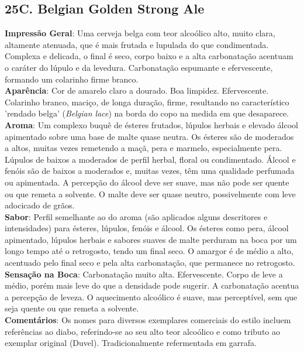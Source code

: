 \subsection*{25C. Belgian Golden Strong Ale}
\textbf{Impressão Geral}: Uma cerveja belga com teor alcoólico alto, muito clara, altamente atenuada, que é mais frutada e lupulada do que condimentada. Complexa e delicada, o final é seco, corpo baixo e a alta carbonatação acentuam o caráter do lúpulo e da levedura. Carbonatação espumante e efervescente, formando um colarinho firme branco. \\
\textbf{Aparência}: Cor de amarelo claro a dourado. Boa limpidez. Efervescente. Colarinho branco, maciço, de longa duração, firme, resultando no característico 'rendado belga' (\textit{Belgian lace}) na borda do copo na medida em que desaparece. \\
\textbf{Aroma}: Um complexo buquê de ésteres frutados, lúpulos herbais e elevado álcool apimentado sobre uma base de malte quase neutra. Os ésteres são de moderados a altos, muitas vezes remetendo a maçã, pera e marmelo, especialmente pera. Lúpulos de baixos a moderados de perfil herbal, floral ou condimentado. Álcool e fenóis são de baixos a moderados e, muitas vezes, têm uma qualidade perfumada ou apimentada. A percepção do álcool deve ser suave, mas não pode ser quente ou que remeta a solvente. O malte deve ser quase neutro, possivelmente com leve adocicado de grãos. \\
\textbf{Sabor}: Perfil semelhante ao do aroma (são aplicados alguns descritores e intensidades) para ésteres, lúpulos, fenóis e álcool. Os ésteres como pera, álcool apimentado, lúpulos herbais e sabores suaves de malte perduram na boca por um longo tempo até o retrogosto, tendo um final seco. O amargor é de médio a alto, acentuado pelo final seco e pela alta carbonatação, que permanece no retrogosto. \\
\textbf{Sensação na Boca}: Carbonatação muito alta. Efervescente. Corpo de leve a médio, porém mais leve do que a densidade pode sugerir. A carbonatação acentua a percepção de leveza. O aquecimento alcoólico é suave, mas perceptível, sem que seja quente ou que remeta a solvente. \\
\textbf{Comentários}: Os nomes para diversos exemplares comerciais do estilo incluem referências ao diabo, referindo-se ao seu alto teor alcoólico e como tributo ao exemplar original (Duvel). Tradicionalmente refermentada em garrafa. \\
